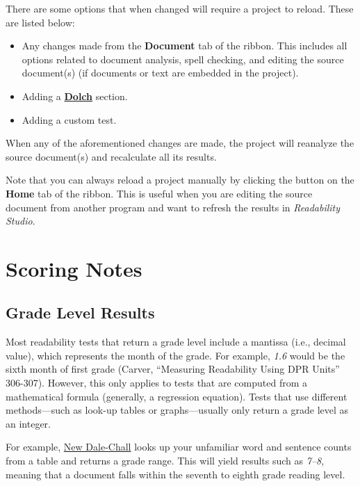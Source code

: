 \documentclass[
]{book}
\providecommand{\tightlist}{%
  \setlength{\itemsep}{0pt}\setlength{\parskip}{0pt}}
\theoremstyle{definition}
\theoremstyle{definition}
\theoremstyle{definition}
\theoremstyle{definition}
\theoremstyle{remark}
\begin{document}
There are some options that when changed will require a project to reload. These are listed below:

\begin{itemize}
\tightlist
\item
  Any changes made from the \textbf{Document} tab of the ribbon. This includes all options related to document analysis, spell checking, and editing the source document(s) (if documents or text are embedded in the project).
\item
  Adding a \protect\hyperlink{reviewing-dolch}{\textbf{Dolch}} section.
\item
  Adding a custom test.
\end{itemize}

When any of the aforementioned changes are made, the project will reanalyze the source document(s) and recalculate all its results.

Note that you can always reload a project manually by clicking the  button on the \textbf{Home} tab of the ribbon. This is useful when you are editing the source document from another program and want to refresh the results in \emph{Readability Studio}.

\hypertarget{scoring-notes}{%
\chapter{Scoring Notes}\label{scoring-notes}}

\hypertarget{grade-level-results}{%
\section{Grade Level Results}\label{grade-level-results}}

Most readability tests that return a grade level include a mantissa (i.e., decimal value), which represents the month of the grade. For example, \emph{1.6} would be the sixth month of first grade (Carver, ``Measuring Readability Using DPR Units'' 306-307). However, this only applies to tests that are computed from a mathematical formula (generally, a regression equation). Tests that use different methods---such as look-up tables or graphs---usually only return a grade level as an integer.

For example, \protect\hyperlink{dale-chall-test}{New Dale-Chall} looks up your unfamiliar word and sentence counts from a table and returns a grade range. This will yield results such as \emph{7--8}, meaning that a document falls within the seventh to eighth grade reading level.
\end{document}
